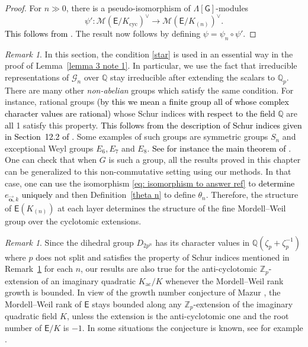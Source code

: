 \documentclass{amsart}
\newcommand{\edit}[1]{\textcolor{black}{#1}}
\numberwithin{equation}{section}
\theoremstyle{remark}
\newtheorem{remark}[theorem]{Remark}
\newcommand{\val}{\vec{\boldsymbol{\alpha}}}
\newcommand{\EC}{\mathsf{E}}
\newcommand{\cG}{\mathcal{G}}
\newcommand{\cM}{\mathcal{M}}
\newcommand{\Qp}{\mathbb{Q}_p}
\newcommand{\sG}{\mathsf{G}}
\newcommand{\Zp}{\mathbb{Z}_p}
\newcommand{\Q}{\mathbb{Q}}
\newcommand{\cyc}{\operatorname{{cyc}}}
\theoremstyle{plain} %
\begin{document}
\begin{proof}
For $n \gg 0$, there is a pseudo-isomorphism of $\Lambda[\sG]$-modules
\[
\psi' : \cM(\EC/K_{\cyc})^\vee \longrightarrow \cM(\EC/K_{(n)})^\vee.
\]
\edit{This follows from \cite[Theorem~3.3 and 3.6]{Lei23}.}
The result now follows by defining $\psi = \psi_n \circ \psi'$.
\end{proof}
\begin{remark}
\label{Rem non abelian}
In this section, the condition \ref{star} is used in an essential way in the proof of Lemma~\ref{lemma 3 note 1}.
In particular, we use the fact that irreducible representations of $\cG_n$ over $\Q$ stay irreducible after extending the scalars to $\Qp$.
There are many other \textit{non-abelian} groups which satisfy the same condition.
For instance, rational groups \edit{(by this we mean a finite group all of whose complex character values are rational)} whose Schur indices \edit{with respect to the field $\Q$} are \edit{all} 1 satisfy this property. \edit{This follows from the description of Schur indices given in Section~12.2 of \cite{Serre1977}.}
Some examples of such groups are symmetric groups $S_n$ and exceptional Weyl groups $E_6, E_7$ and $E_8$.
\edit{See for instance the main theorem of \cite{Benard}.}
One can check that when $G$ is such a group, all the results proved in this chapter can be generalized to this non-commutative setting using our methods.
In that case, one \edit{can} use the isomorphism \eqref{eq: isomorphism to answer ref} to \edit{determine} $e_{\val, k}$ \edit{uniquely} and then Definition~\ref{theta n} to define $\theta_n$.
Therefore, the structure of $\EC(K_{(n)})$ at each layer determines the structure of the fine Mordell--Weil group over the cyclotomic extensions.
\end{remark}

\begin{remark}\label{anticyclotomic remark}
Since the dihedral group $D_{2p^n}$ has its character values in $\Q(\zeta_p+\zeta_p^{-1})$ where $p$ does not split and satisfies the property of Schur indices mentioned in Remark~\ref{Rem non abelian} for each $n$, our results are also true for the anti-cyclotomic $\Zp$-extension of an imaginary quadratic $K_{\operatorname{ac}}/K$ whenever the Mordell--Weil rank growth is bounded.
In view of the growth number conjecture of Mazur \cite[\S~18, p.~201]{Maz84}, the Mordell--Weil rank of $\EC$ stays bounded along any $\Zp$-extension of the imaginary quadratic field $K$, unless the extension is the anti-cyclotomic one and the root number of $\EC/K$ is $-1$.
In some situations the conjecture is known, see for example \cite{Gre_PCMS, KMS, GHKL, KL25}.
\end{remark}
\end{document}
